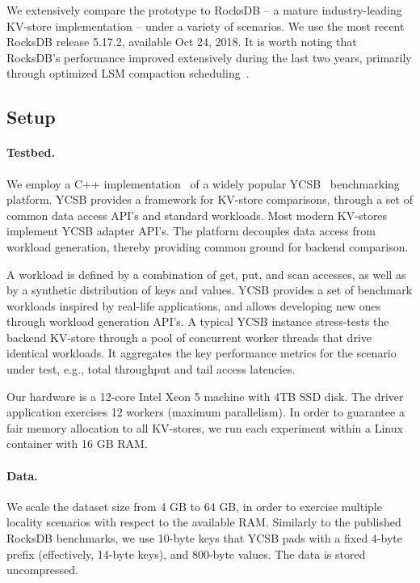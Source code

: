 We extensively compare the \sys\/ prototype to RocksDB -- a mature industry-leading KV-store implementation  -- under a variety of scenarios.  We use the most recent RocksDB release 5.17.2, available Oct 24, 2018.  
It is worth noting that RocksDB's performance improved extensively during the last two years, primarily through 
optimized LSM compaction scheduling~\cite{RocksDBProgress}.   

\subsection{Setup}

\paragraph{Testbed.} We employ a C++ implementation~\cite{Cpp-YCSB} of a widely popular 
YCSB~\cite{Cooper:2010:BCS:1807128.1807152} benchmarking platform. 
YCSB provides a framework for KV-store comparisons, through a set of common data access API's and standard workloads. 
Most modern KV-stores implement  YCSB adapter API's. The platform decouples data access from workload generation, 
thereby providing common ground for backend comparison. 

A workload is defined by a combination of get, put, and scan accesses, as well as by a synthetic distribution of keys and values. 
YCSB provides a set of benchmark workloads inspired by real-life applications, and allows developing new ones through workload generation API's. 
A typical YCSB instance stress-tests the backend KV-store through a pool of concurrent worker threads that drive identical
workloads. It aggregates the key performance metrics for the scenario under test, e.g., total throughput and tail access latencies. 

Our hardware is a 12-core Intel Xeon 5 machine with 4TB SSD disk. The driver application exercises 12 workers 
(maximum parallelism). In order to guarantee a fair memory allocation to all KV-stores, we run each experiment 
within a Linux container with 16 GB RAM. 

\paragraph{Data.} We scale the dataset size from 4 GB to 64 GB, in order to exercise multiple locality 
scenarios with respect to the available RAM. Similarly to the published RocksDB benchmarks, we use 
10-byte keys that YCSB pads with a fixed 4-byte prefix (effectively, 14-byte keys), and 800-byte values. 
The data is stored uncompressed. 

